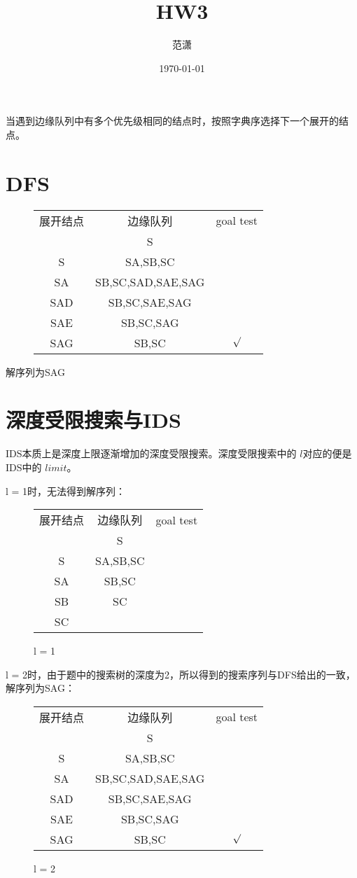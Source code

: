 \documentclass[12pt, a4paper, oneside]{ctexart}
\title{\textbf{HW3}}
\author{范潇\quad2254298}
\date{\today}
\begin{document}
\maketitle
当遇到边缘队列中有多个优先级相同的结点时，按照字典序选择下一个展开的结点。
\section{DFS}
\begin{figure}[htbp]
    \centering
    \begin{tabular}{ccc}
       展开结点&边缘队列&goal test\\
              &S      &          \\
       S      &SA,SB,SC     &         \\
       SA      &SB,SC,SAD,SAE,SAG     &         \\
       SAD      &SB,SC,SAE,SAG     &         \\
       SAE      &SB,SC,SAG     &         \\
       SAG      &SB,SC     &   $\surd$      \\
    \end{tabular}
\end{figure}
解序列为SAG
\section{深度受限搜索与IDS}
IDS本质上是深度上限逐渐增加的深度受限搜索。深度受限搜索中的 $l$对应的便是IDS中的 $limit$。

l = 1时，无法得到解序列：
\begin{figure}[!h]
    \centering
    \begin{tabular}{ccc}
       展开结点&边缘队列&goal test\\
              &S      &          \\
       S      &SA,SB,SC     &         \\
       SA      &SB,SC     &         \\
       SB      &SC     &         \\
       SC      &     &         \\
    \end{tabular}
    \caption{l = 1}
\end{figure}

l = 2时，由于题中的搜索树的深度为2，所以得到的搜索序列与DFS给出的一致，解序列为SAG：
\begin{figure}[htbp]
    \centering
    \begin{tabular}{ccc}
       展开结点&边缘队列&goal test\\
              &S      &          \\
       S      &SA,SB,SC     &         \\
       SA      &SB,SC,SAD,SAE,SAG     &         \\
       SAD      &SB,SC,SAE,SAG     &         \\
       SAE      &SB,SC,SAG     &         \\
       SAG      &SB,SC     &   $\surd$      \\
    \end{tabular}
    \caption{l = 2}
\end{figure}
\end{document}
